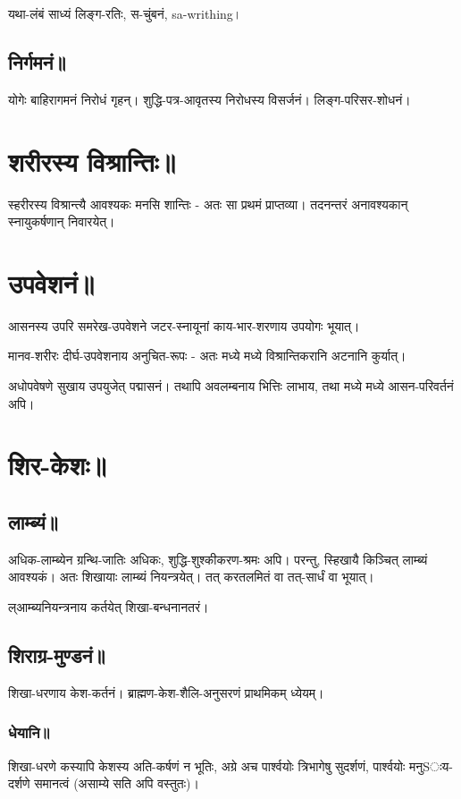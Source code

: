 \documentclass[oneside, article]{memoir}
\begin{document}
यथा-लंबं साध्यं लिङ्ग-रतिः, स-चुंबनं, sa-writhing।

\section{निर्गमनं॥}
योगेः बाहिरागमनं निरोधं गृहन्। शुद्धि-पत्र-आवृतस्य निरोधस्य विसर्जनं। लिङ्ग-परिसर-शोधनं।

\chapter{शरीरस्य विश्रान्तिः॥}
स्हरीरस्य विश्रान्त्यै आवश्यकः मनसि शान्तिः - अतः सा प्रथमं प्राप्तव्या। तदनन्तरं अनावश्यकान् स्नायुकर्षणान् निवारयेत्।

\chapter{उपवेशनं॥}
आसनस्य उपरि समरेख-उपवेशने जटर-स्नायूनां काय-भार-शरणाय उपयोगः भूयात्।

मानव-शरीरः दीर्घ-उपवेशनाय अनुचित-रूपः - अतः मध्ये मध्ये विश्रान्तिकरानि अटनानि कुर्यात्।

अधोपवेषणे सुखाय उपयुजेत् पद्मासनं। तथापि अवलम्बनाय भित्तिः लाभाय, तथा‌ मध्ये मध्ये आसन-परिवर्तनं अपि।

\chapter{शिर-केशः॥}
\section{लाम्ब्यं॥}
अधिक-लाम्ब्येन ग्रन्थि-जातिः अधिकः, शुद्धि-शुश्कीकरण-श्रमः अपि। परन्तु, स्हिखायै किञ्चित् लाम्ब्यं आवश्यकं। अतः शिखायाः लाम्ब्यं नियन्त्रयेत्। तत् करतलमितं वा तत्-सार्धं वा भूयात्।

ल्आम्ब्यनियन्त्रनाय कर्तयेत् शिखा-बन्धनानतरं।

\section{शिराग्र-मुण्डनं॥}
शिखा-धरणाय केश-कर्तनं। ब्राह्मण-केश-शैलि-अनुसरणं प्राथमिकम् ध्येयम्।

\subsection{धेयानि॥}

शिखा-धरणे कस्यापि केशस्य अति-कर्षणं न भूतिः, अग्रे अच पार्श्वयोः त्रिभागेषु सुदर्शणं, पार्श्वयोः मनुSःय-दर्शणे समानत्वं (असाम्ये सति अपि वस्तुतः)। 
\end{document}
